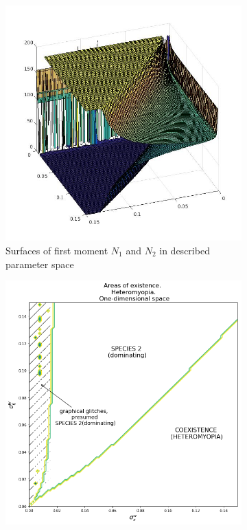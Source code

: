 \begin{figure}[ht]
	\centering
	\begin{subfigure}{.5\textwidth}
		\centering
		\includegraphics[width=.93\linewidth]{N1N2hm08D1.jpg}
		\caption{Surfaces of first moment \(N_1\) and \(N_2\) in described parameter space}
		\label{fig:hmd1:sub1}
	\end{subfigure}%
	\begin{subfigure}{.5\textwidth}
		\centering
		\includegraphics[width=.93\linewidth]{arhm08d1.png}

\end{subfigure}
\end{figure}
